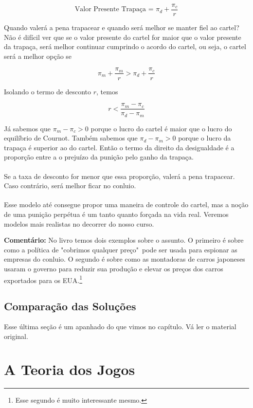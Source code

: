 \documentclass[a4paper,11pt,oneside]{book}
\theoremstyle{definition}
\theoremstyle{break}
\begin{document}
$$ \textrm{Valor Presente Trapaça = } \pi_d + \frac{\pi_c}{r} $$

Quando valerá a pena trapacear e quando será melhor se manter fiel ao cartel? Não é difícil ver que se o valor presente do cartel for maior que o valor presente da trapaça, será melhor continuar cumprindo o acordo do cartel, ou seja, o cartel será a melhor opção se

$$ \pi_m + \frac{\pi_m}{r} > \pi_d + \frac{\pi_c}{r} $$

Isolando o termo de desconto $r$, temos

$$ r < \frac{\pi_m - \pi_c}{\pi_d - \pi_m} $$

Já sabemos que $\pi_m - \pi_c > 0$ porque o lucro do cartel é maior que o lucro do equilíbrio de Cournot. Também sabemos que $\pi_d - \pi_m > 0$ porque o lucro da trapaça é superior ao do cartel. Então o termo da direito da desigualdade é a proporção entre a o prejuízo da punição pelo ganho da trapaça.
\\~\\
Se a taxa de desconto for menor que essa proporção, valerá a pena trapacear. Caso contrário, será melhor ficar no conluio.
\\~\\
Esse modelo até consegue propor uma maneira de controle do cartel, mas a noção de uma punição perpétua é um tanto quanto forçada na vida real. Veremos modelos mais realistas no decorrer do nosso curso.

\textbf{Comentário:} No livro temos dois exemplos sobre o assunto. O primeiro é sobre como a política de "cobrimos qualquer preço"\ pode ser usada para espionar as empresas do conluio.  O segundo é sobre como as montadoras de carros japoneses usaram o governo para reduzir sua produção e elevar os preços dos carros exportados para os EUA.\footnote{Esse segundo é muito interessante mesmo.}

\section{Comparação das Soluções}

Esse última seção é um apanhado do que vimos no capítulo. Vá ler o material original.

\chapter{A Teoria dos Jogos}
\end{document}
